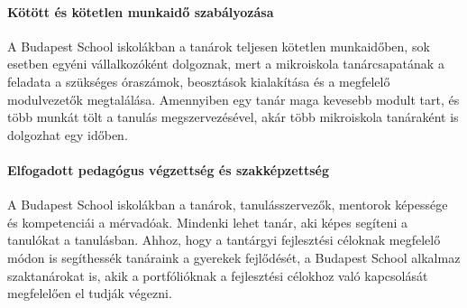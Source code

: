 \paragraph{Kötött és kötetlen munkaidő szabályozása}

A Budapest School  iskolákban a tanárok teljesen kötetlen munkaidőben, sok esetben egyéni vállalkozóként dolgoznak, mert a mikroiskola tanárcsapatának a feladata a szükséges óraszámok, beosztások kialakítása és a megfelelő modulvezetők megtalálása. Amennyiben egy tanár maga kevesebb modult tart, és több munkát tölt a tanulás megszervezésével, akár több mikroiskola tanáraként is dolgozhat egy időben.

\paragraph{Elfogadott pedagógus végzettség és szakképzettség}

A Budapest School iskolákban a tanárok, tanulásszervezők, mentorok képessége és kompetenciái a mérvadóak. Mindenki lehet tanár, aki képes segíteni a tanulókat a tanulásban. Ahhoz, hogy a tantárgyi fejlesztési céloknak megfelelő módon is segíthessék tanáraink a gyerekek fejlődését, a Budapest School alkalmaz szaktanárokat is, akik a portfólióknak a fejlesztési célokhoz való kapcsolását megfelelően el tudják végezni.
